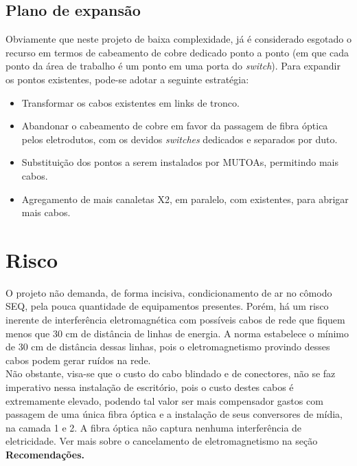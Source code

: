 \documentclass[	DIV=calc,%
							paper=a4,%
							fontsize=12pt,%
							onecolumn]{scrartcl}	 					%
\begin{document}
\subsection{Plano de expansão}

Obviamente que neste projeto de baixa complexidade, já é considerado esgotado o recurso em termos de cabeamento de cobre dedicado ponto a ponto (em que cada ponto da área de trabalho é um ponto em uma porta do \textit{switch}). Para expandir os pontos existentes, pode-se adotar a seguinte estratégia:
\\

\begin{itemize}
	\item Transformar os cabos existentes em links de tronco.
	\\
	\item Abandonar o cabeamento de cobre em favor da passagem de fibra óptica pelos eletrodutos, com os devidos \textit{switches} dedicados e separados por duto.
	\\
	\item Substituição dos pontos a serem instalados por MUTOAs, permitindo mais cabos.
	\\
	\item Agregamento de mais canaletas X2, em paralelo, com existentes, para abrigar mais cabos.
\end{itemize}


\section{Risco}

O projeto não demanda, de forma incisiva, condicionamento de ar no cômodo SEQ, pela pouca quantidade de equipamentos presentes. Porém, há um risco inerente de interferência eletromagnética com possíveis cabos de rede que fiquem menos que 30 cm de distância de linhas de energia. A norma estabelece o mínimo de 30 cm de distância dessas linhas, pois o eletromagnetismo provindo desses cabos podem gerar ruídos na rede.
\\

Não obstante, visa-se que o custo do cabo blindado e de conectores, não se faz imperativo nessa instalação de escritório, pois o custo destes cabos é extremamente elevado, podendo tal valor ser mais compensador gastos com passagem de uma única fibra óptica e a instalação de seus conversores de mídia, na camada 1 e 2. A fibra óptica não captura nenhuma interferência de eletricidade. Ver mais sobre o cancelamento de eletromagnetismo na seção \textbf{Recomendações.}
\end{document}
